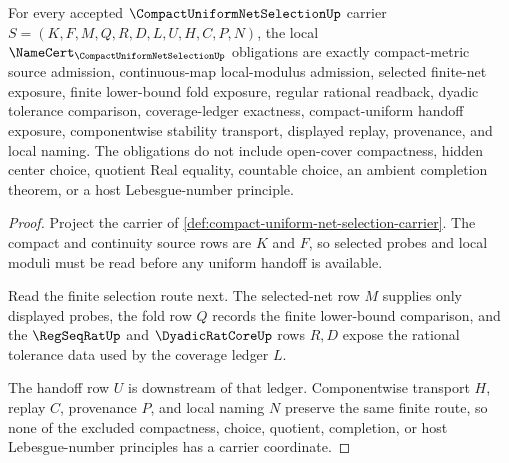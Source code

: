 \begin{theorem}
\label{thm:compact-uniform-net-selection-namecert-obligations}
For every accepted $\CompactUniformNetSelectionUp$ carrier $S=(K,F,M,Q,R,D,L,U,H,C,P,N)$, the local $\NameCert_{\CompactUniformNetSelectionUp}$ obligations are exactly compact-metric source admission, continuous-map local-modulus admission, selected finite-net exposure, finite lower-bound fold exposure, regular rational readback, dyadic tolerance comparison, coverage-ledger exactness, compact-uniform handoff exposure, componentwise stability transport, displayed replay, provenance, and local naming. The obligations do not include open-cover compactness, hidden center choice, quotient Real equality, countable choice, an ambient completion theorem, or a host Lebesgue-number principle.
\end{theorem}
\begin{proof}
Project the carrier of \autoref{def:compact-uniform-net-selection-carrier}. The compact and continuity source rows are $K$ and $F$, so selected probes and local moduli must be read before any uniform handoff is available.

Read the finite selection route next. The selected-net row $M$ supplies only displayed probes, the fold row $Q$ records the finite lower-bound comparison, and the $\RegSeqRatUp$ and $\DyadicRatCoreUp$ rows $R,D$ expose the rational tolerance data used by the coverage ledger $L$.

The handoff row $U$ is downstream of that ledger. Componentwise transport $H$, replay $C$, provenance $P$, and local naming $N$ preserve the same finite route, so none of the excluded compactness, choice, quotient, completion, or host Lebesgue-number principles has a carrier coordinate.
\end{proof}

